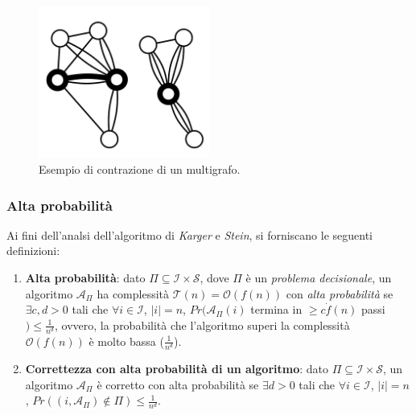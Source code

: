 \begin{figure}[H]
	\centering
	\includegraphics[width=0.5\textwidth]{res/images/multigraph}
	\caption{Esempio di contrazione di un multigrafo.}
	\label{fig:multigraph_contraction}
\end{figure}

\subsubsection*{Alta probabilità}

Ai fini dell'analsi dell'algoritmo di \textit{Karger} e \textit{Stein}, si forniscano le seguenti definizioni:
\begin{enumerate}
    \item \textbf{Alta probabilità}: dato $\Pi \subseteq \mathcal{I} \times \mathcal{S}$, dove $\Pi$ è un 
    \textit{problema decisionale}, un algoritmo $\mathcal{A}_{\Pi}$ ha complessità 
    $\mathcal{T}(n) = \mathcal{O}(f(n))$ con \textit{alta probabilità} se $\exists c, d > 0$ tali che 
    $\forall i \in \mathcal{I}$, $|i| = n$, $Pr(\mathcal{A}_{\Pi}(i)$ termina in $\ge c \dot f(n)$ passi $) \le \frac{1}{n^d}$, 
    ovvero, la probabilità che l'algoritmo superi la complessità $\mathcal{O}(f(n))$ è molto bassa ($\frac{1}{n^d}$).
    \item \textbf{Correttezza con alta probabilità di un algoritmo}: dato $\Pi \subseteq \mathcal{I} \times \mathcal{S}$, 
    un algoritmo $\mathcal{A}_{\Pi}$ è corretto con alta probabilità se $\exists d > 0$ tali che 
    $\forall i \in \mathcal{I}$, $|i| = n$, $Pr((i, \mathcal{A}_{\Pi}) \notin \Pi) \le \frac{1}{n^d}$.
\end{enumerate}

